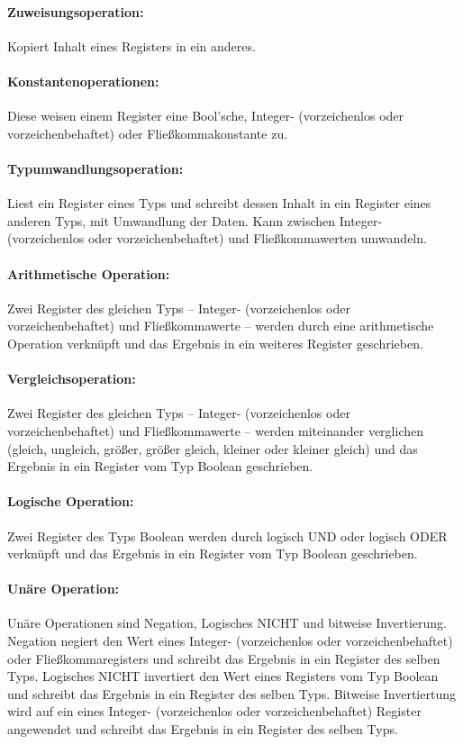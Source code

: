 \documentclass[twoside,a4paper,fleqn,12pt]{article}
\begin{document}
\paragraph{Zuweisungsoperation:} Kopiert Inhalt eines Registers in ein anderes.

\paragraph{Konstantenoperationen:} Diese weisen einem Register eine Bool'sche, Integer- (vorzeichenlos oder vorzeichenbehaftet) oder
Fließkommakonstante zu.

\paragraph{Typumwandlungsoperation:} Liest ein Register eines Typs und schreibt dessen Inhalt in ein Register eines anderen Typs, mit Umwandlung der Daten.
Kann zwischen Integer- (vorzeichenlos oder vorzeichenbehaftet) und Fließkommawerten umwandeln.

\paragraph{Arithmetische Operation:} Zwei Register des gleichen Typs -- Integer- (vorzeichenlos oder vorzeichenbehaftet) und Fließkommawerte --
werden durch eine arithmetische Operation verknüpft und das Ergebnis in ein weiteres Register geschrieben.

\paragraph{Vergleichsoperation:} Zwei Register des gleichen Typs -- Integer- (vorzeichenlos oder vorzeichenbehaftet) und Fließkommawerte --
werden miteinander verglichen (gleich, ungleich, größer, größer gleich, kleiner oder kleiner gleich) und das Ergebnis in ein Register vom Typ Boolean geschrieben.

\paragraph{Logische Operation:} Zwei Register des Typs Boolean werden durch logisch UND oder logisch ODER verknüpft und das Ergebnis in ein Register vom Typ Boolean geschrieben.

\paragraph{Unäre Operation:} Unäre Operationen sind Negation, Logisches NICHT und bitweise Invertierung.
Negation negiert den Wert eines Integer- (vorzeichenlos oder vorzeichenbehaftet) oder Fließkommaregisters und schreibt das Ergebnis in ein Register des selben Typs.
Logisches NICHT invertiert den Wert eines Registers vom Typ Boolean und schreibt das Ergebnis in ein Register des selben Typs.
Bitweise Invertiertung wird auf ein eines Integer- (vorzeichenlos oder vorzeichenbehaftet) Register angewendet und schreibt das Ergebnis in ein Register des selben Typs.
\end{document}
